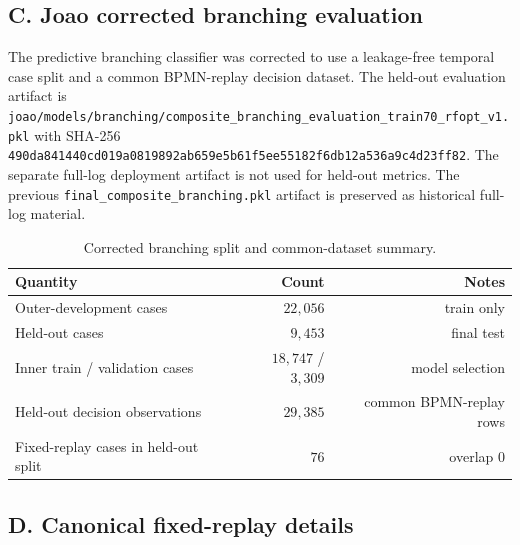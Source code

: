 \subsection*{C. Joao corrected branching evaluation}\label{app:joao_branching_model_selection}
The predictive branching classifier was corrected to use a leakage-free temporal
case split and a common BPMN-replay decision dataset. The held-out evaluation
artifact is
\texttt{joao/models/branching/composite\_branching\_evaluation\_train70\_rfopt\_v1.pkl}
with SHA-256
\texttt{490da841440cd019a0819892ab659e5b61f5ee55182f6db12a536a9c4d23ff82}.
The separate full-log deployment artifact is not used for held-out metrics. The
previous \texttt{final\_composite\_branching.pkl} artifact is preserved as
historical full-log material.

\begin{table}[H]
    \caption{Corrected branching split and common-dataset summary.}
    \centering
    \scriptsize
    \begin{tabular}{lrr}
        \toprule
        \textbf{Quantity} & \textbf{Count} & \textbf{Notes} \\
        \midrule
        Outer-development cases & $22{,}056$ & train only \\
        Held-out cases & $9{,}453$ & final test \\
        Inner train / validation cases & $18{,}747$ / $3{,}309$ & model selection \\
        Held-out decision observations & $29{,}385$ & common BPMN-replay rows \\
        Fixed-replay cases in held-out split & $76$ & overlap $0$ \\
        \bottomrule
    \end{tabular}
\end{table}

\subsection*{D. Canonical fixed-replay details}


